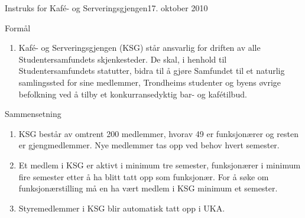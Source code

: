 
\begin{instruks}{Instruks for Kafé- og Serveringsgjengen}{17. oktober 2010}{ }

    \begin{instruksledd}{Formål}
        \begin{enumerate}
            \item Kafé- og Serveringsgjengen (KSG) står ansvarlig for driften av alle
Studentersamfundets skjenkesteder. De skal, i henhold til Studentersamfundets statutter, bidra til å
gjøre Samfundet til et naturlig samlingssted for sine medlemmer, Trondheims studenter og byens
øvrige befolkning ved å tilby et konkurransedyktig bar- og kafétilbud.
        \end{enumerate}
    \end{instruksledd}

    \begin{instruksledd}{Sammensetning}
        \begin{enumerate}
            \item KSG består av omtrent 200 medlemmer, hvorav 49 er funksjonærer og resten er
gjengmedlemmer. Nye medlemmer tas opp ved behov hvert semester.
            \item Et medlem i KSG er aktivt i minimum tre semester, funksjonærer i minimum fire
semester etter å ha blitt tatt opp som funksjonær. For å søke om funksjonærstilling må en ha vært
medlem i KSG minimum et semester.
            \item Styremedlemmer i KSG blir automatisk tatt opp i UKA.
        \end{enumerate}
    \end{instruksledd}


\end{instruks}
